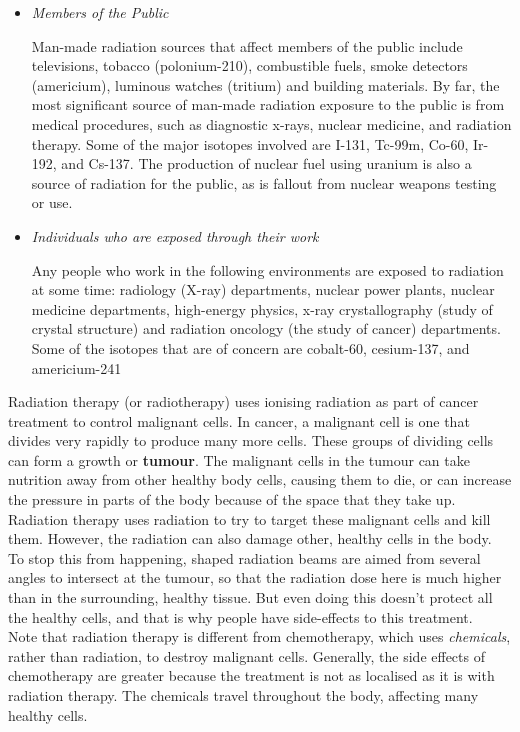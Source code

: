 	\begin{itemize}
	\item{\textit{Members of the Public}

Man-made radiation sources that affect members of the public include televisions, tobacco (polonium-210), combustible fuels, smoke detectors (americium), luminous watches (tritium) and building materials. By far, the most significant source of man-made radiation exposure to the public is from medical procedures, such as diagnostic x-rays, nuclear medicine, and radiation therapy. Some of the major isotopes involved are I-131, Tc-99m, Co-60, Ir-192, and Cs-137. The production of nuclear fuel using uranium is also a source of radiation for the public, as is fallout from nuclear weapons testing or use.
}
	\item{\textit{Individuals who are exposed through their work}

Any people who work in the following environments are exposed to radiation at some time: radiology (X-ray) departments, nuclear power plants, nuclear medicine departments, high-energy physics, x-ray crystallography (study of crystal structure) and radiation oncology (the study of cancer) departments. Some of the isotopes that are of concern are cobalt-60, cesium-137, and americium-241}
\end{itemize}



\begin{IFact}{
Radiation therapy (or radiotherapy) uses ionising radiation as part of cancer treatment to control malignant cells. In cancer, a malignant cell is one that divides very rapidly to produce many more cells. These groups of dividing cells can form a growth or \textbf{tumour}. The malignant cells in the tumour can take nutrition away from other healthy body cells, causing them to die, or can increase the pressure in parts of the body because of the space that they take up. Radiation therapy uses radiation to try to target these malignant cells and kill them. However, the radiation can also damage other, healthy cells in the body. To stop this from happening, shaped radiation beams are aimed from several angles to intersect at the tumour, so that the radiation dose here is much higher than in the surrounding, healthy tissue. But even doing this doesn't protect all the healthy cells, and that is why people have side-effects to this treatment. \\

Note that radiation therapy is different from chemotherapy, which uses \textit{chemicals}, rather than radiation, to destroy malignant cells. Generally, the side effects of chemotherapy are greater because the treatment is not as localised as it is with radiation therapy. The chemicals travel throughout the body, affecting many healthy cells. 
}
\end{IFact}
\


